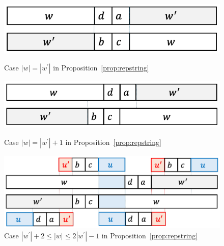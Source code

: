 \begin{figure}[t]
\begin{center}
  \includegraphics[scale=0.345]{figs/w=w_1.pdf}
  \caption{Case $|w| = |w^{\prime}|$ in Proposition~\ref{prop:repstring}}\label{fig:prop_pic7}
  \bigskip
  \includegraphics[scale=0.345]{figs/w=w_1+1.pdf}
  \caption{Case $|w| = |w^{\prime}| + 1$ in Proposition~\ref{prop:repstring}}\label{fig:prop_pic8}
\end{center}
\end{figure}

\begin{figure}[t]
\begin{center}
  \includegraphics[scale=0.345]{figs/w=w_1+2.pdf}
  \caption{Case $|w^{\prime}| + 2 \le |w| \le 2|w^{\prime}| - 1$ in Proposition~\ref{prop:repstring}}\label{fig:prop_pic9}
\end{center}
\end{figure}

